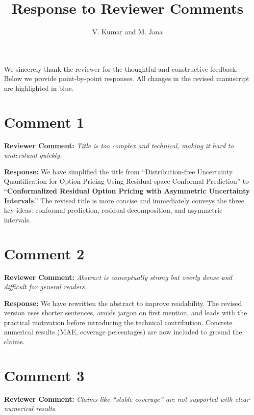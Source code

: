 \documentclass[11pt]{article}
\title{Response to Reviewer Comments}
\author{V. Kumar and M. Jana}
\date{}
\newcommand{\rev}[1]{\textbf{Reviewer Comment:} \textit{#1}}
\newcommand{\resp}[1]{\textbf{Response:} #1}
\begin{document}
\maketitle

We sincerely thank the reviewer for the thoughtful and constructive feedback. Below we provide point-by-point responses. All changes in the revised manuscript are highlighted in {\color{blue}blue}.

\section*{Comment 1}
\rev{Title is too complex and technical, making it hard to understand quickly.}

\resp{We have simplified the title from ``Distribution-free Uncertainty Quantification for Option Pricing Using Residual-space Conformal Prediction'' to ``\textbf{Conformalized Residual Option Pricing with Asymmetric Uncertainty Intervals}.'' The revised title is more concise and immediately conveys the three key ideas: conformal prediction, residual decomposition, and asymmetric intervals.}

\section*{Comment 2}
\rev{Abstract is conceptually strong but overly dense and difficult for general readers.}

\resp{We have rewritten the abstract to improve readability. The revised version uses shorter sentences, avoids jargon on first mention, and leads with the practical motivation before introducing the technical contribution. Concrete numerical results (MAE, coverage percentages) are now included to ground the claims.}

\section*{Comment 3}
\rev{Claims like ``stable coverage'' are not supported with clear numerical results.}
\end{document}

